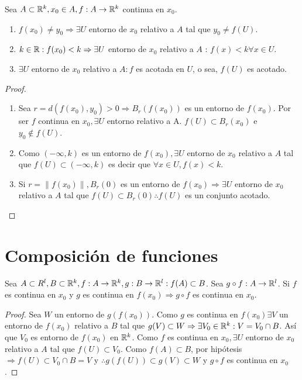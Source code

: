 \begin{prop}
  Sea \(A \subset \mathbb{R}^k, x_0 \in A, f: A \to \mathbb{R}^k\) continua en \(x_0\).
  \begin{enumerate}
    \item \(f(x_0) \neq y_0 \Rightarrow \exists U\) entorno de \(x_0\) relativo a \(A\) tal que \(y_0 \neq f(U)\).
    \item \(k \in \mathbb{R} : f(x_0) < k \Rightarrow \exists U\) entorno de \(x_0\) relativo a \(A\) : \(f(x) < k \forall x \in U\).
    \item \(\exists U\) entorno de \(x_0\) relativo a \(A : f\) es acotada en \(U\), o sea, \(f(U)\) es acotado.
  \end{enumerate}

  \begin{proof}
    \begin{enumerate}
      \item Sea \(r = d(f(x_0), y_0) > 0 \Rightarrow B_r(f(x_0))\) es un entorno de \(f(x_0)\). Por ser \(f\) continua en \(x_0, \exists U\) entorno relativo a A. \(f(U) \subset B_r(x_0)\) e \(y_0 \notin f(U)\).
      \item Como \((-\infty, k)\) es un entorno de \(f(x_0), \exists U\) entorno de \(x_0\) relativo a \(A\) tal que \(f(U) \subset (-\infty, k)\) es decir que \(\forall x \in U, f(x) < k\).
      \item Si \(r = \|f(x_0)\|, B_r(0)\) es un entorno de \(f(x_0) \Rightarrow \exists U\) entorno de \(x_0\) relativo a \(A\) tal que \(f(U) \subset B_r(0) \therefore f(U)\) es un conjunto acotado.
    \end{enumerate}
  \end{proof}
\end{prop}

\section{Composición de funciones}

\begin{theorem}
  Sea \(A \subset R^l, B \subset \mathbb{R}^k, f: A \to \mathbb{R}^k, g: B \to \mathbb{R}^l : f(A) \subset B\). Sea \(g \circ f: A \to \mathbb{R}^l\). Si \(f\) es continua en \(x_0\) y \(g\) es continua en \(f(x_0) \Rightarrow g \circ f\) es continua en \(x_0\).
  \begin{proof}
    Sea \(W\) un entorno de \(g(f(x_0))\). Como \(g\) es continua en \(f(x_0) \exists V\) un entorno de \(f(x_0)\) relativo a \(B\) tal que \(g(V) \subset W \Rightarrow \exists V_0 \in \mathbb{R}^k : V = V_0 \cap B\). Así que \(V_0\) es entorno de \(f(x_0)\) en \(\mathbb{R}^k\). Como \(f\) es continua en \(x_0, \exists U\) entorno de \(x_0\) relativo a \(A\) tal que \(f(U) \subset V_0\). Como \(f(A) \subset B\), por hipótesis \(\Rightarrow f(U) \subset V_0 \cap B = V\) y \(\therefore g(f(U)) \subset g(V) \subset W\) y \(g \circ f\) es continua en \(x_0\).
  \end{proof}
\end{theorem}


